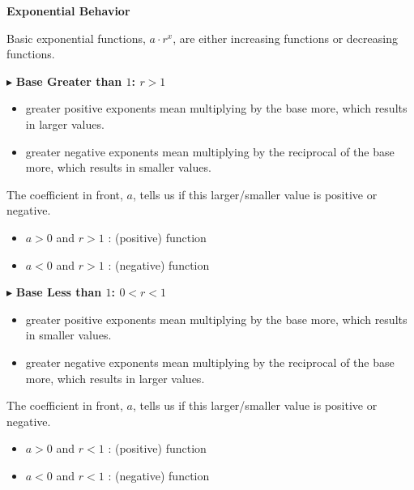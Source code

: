 \documentclass{ximera}
\begin{document}
\begin{summary} \textbf{\textcolor{blue!75!black}{Exponential Behavior}}


Basic exponential functions, $a \cdot r^x$, are either increasing functions or decreasing functions.


$\blacktriangleright$  \textbf{\textcolor{purple!85!blue}{Base Greater than $1$: $r > 1$}} 


\begin{itemize}
\item greater positive exponents mean multiplying by the base more, which results in larger values.  
\item greater negative exponents mean multiplying by the reciprocal of the base more, which results in smaller values.  
\end{itemize}


The coefficient in front, $a$, tells us if this larger/smaller value is positive or negative.


\begin{itemize}
\item $a > 0$ and $r > 1$ :   (positive) function
\item $a < 0$ and $r > 1$ :   (negative) function  
\end{itemize}






$\blacktriangleright$  \textbf{\textcolor{purple!85!blue}{Base Less than $1$: $0 < r < 1$}}  


\begin{itemize} 
\item greater positive exponents mean multiplying by the base more, which results in smaller values.  
\item greater negative exponents mean multiplying by the reciprocal of the base more, which results in larger values.  
\end{itemize}


The coefficient in front, $a$, tells us if this larger/smaller value is positive or negative.


\begin{itemize}
\item $a > 0$ and $r < 1$ :   (positive) function
\item $a < 0$ and $r < 1$ :   (negative) function  
\end{itemize}



\end{summary}
\end{document}
